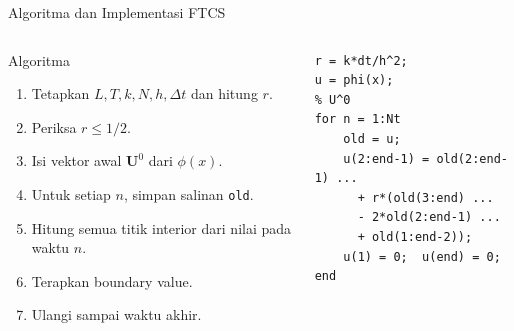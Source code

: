 \documentclass[aspectratio=169,10pt]{beamer}
\begin{document}
\begin{frame}[fragile]{Algoritma dan Implementasi FTCS}
\footnotesize
\begin{columns}[T,onlytextwidth]
\begin{block}{Algoritma}
\begin{enumerate}
  \item Tetapkan $L,T,k,N,h,\Delta t$ dan hitung $r$.
  \item Periksa $r\le1/2$.
  \item Isi vektor awal $\mathbf U^0$ dari $\phi(x)$.
  \item Untuk setiap $n$, simpan salinan \texttt{old}.
  \item Hitung semua titik interior dari nilai pada waktu $n$.
  \item Terapkan boundary value.
  \item Ulangi sampai waktu akhir.
\end{enumerate}
\end{block}
\begin{lstlisting}[style=matlab]
r = k*dt/h^2;
u = phi(x);                 % U^0
for n = 1:Nt
    old = u;
    u(2:end-1) = old(2:end-1) ...
      + r*(old(3:end) ...
      - 2*old(2:end-1) ...
      + old(1:end-2));
    u(1) = 0;  u(end) = 0;
end
\end{lstlisting}
\end{columns}
\end{frame}
\end{document}
